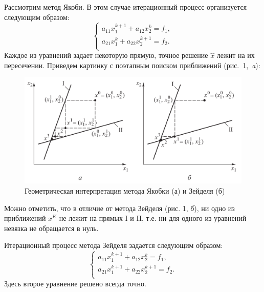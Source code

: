 \documentclass[12pt, a4paper]{article}
\begin{document}
\begin{enumerate}
Рассмотрим метод Якоби. В этом случае итерационный процесс организуется следующим образом:
\begin{equation*}
        	\begin{cases}
        		a_{11} x^{k+1}_1 + a_{12} x^k_2 = f_1,\\
        		a_{21} x^{k}_1 + a_{22} x^{k+1}_2 = f_2.\\
        	\end{cases}
\end{equation*}
Каждое из уравнений задает некоторую прямую, точное решение $\hat{x}$ лежит на их пересечении. Приведем картинку с поэтапным поиском приближений \mbox{(рис. 1, \emph{a})}:
	\begin{figure}[H]
			\centering
			\includegraphics[width=0.8\linewidth]{geom_yak_zeyd.png}
			\caption{Геометрическая интерпретация метода Якобки (а) и Зейделя (б)}
			\label{yakzeyd}
	\end{figure}
Можно отметить, что в отличие от метода Зейделя (рис. 1, \emph{б}), ни одно из приближений $x^K$ не лежит на прямых I и II, т.е. ни для одного из уравнений невязка не обращается в нуль.

Итерационный процесс метода Зейделя задается следующим образом:
\begin{equation*}
        	\begin{cases}
        		a_{11} x^{k+1}_1 + a_{12} x^k_2 = f_1,\\
        		a_{21} x^{k+1}_1 + a_{22} x^{k+1}_2 = f_2.\\
        	\end{cases}
\end{equation*}
Здесь второе уравнение решено всегда точно.


\end{enumerate}
\end{document}
